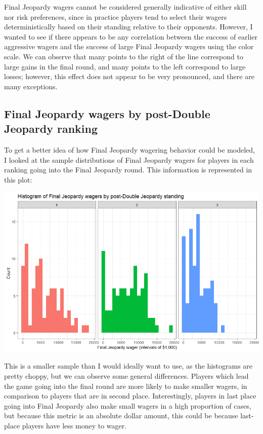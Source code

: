 \documentclass{article}
\begin{document}
Final Jeopardy wagers cannot be considered generally indicative of either skill nor risk preferences, since in practice players tend to select their wagers deterministically based on their standing relative to their opponents. However, I wanted to see if there appears to be any correlation between the success of earlier aggressive wagers and the success of large Final Jeopardy wagers using the color scale. We can observe that many points to the right of the line correspond to large gains in the final round, and many points to the left correspond to large losses; however, this effect does not appear to be very pronounced, and there are many exceptions.

\subsection{Final Jeopardy wagers by post-Double Jeopardy ranking}

To get a better idea of how Final Jeopardy wagering behavior could be modeled, I looked at the sample distributions of Final Jeopardy wagers for players in each ranking going into the Final Jeopardy round. This information is represented in this plot:

\smallskip

\includegraphics[width=\textwidth]{PS6b_Mondry.png}

\smallskip

This is a smaller sample than I would ideally want to use, as the histograms are pretty choppy, but we can observe some general differences. Players which lead the game going into the final round are more likely to make smaller wagers, in comparison to players that are in second place. Interestingly, players in last place going into Final Jeopardy also make small wagers in a high proportion of cases, but because this metric is an absolute dollar amount, this could be because last-place players have less money to wager.
\end{document}
